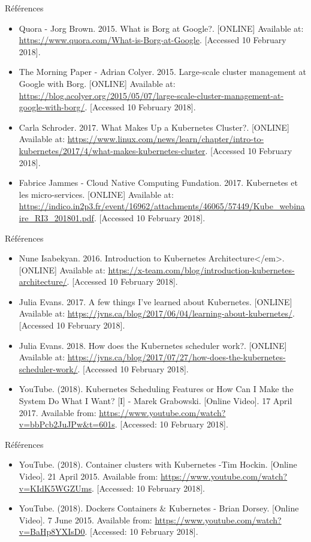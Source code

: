\documentclass{bredelebeamer}
\begin{document}
\begin{frame}{Références}
\begin{itemize}
\item Quora - Jorg Brown. 2015. What is Borg at Google?. [ONLINE] Available at: \url{https://www.quora.com/What-is-Borg-at-Google}. [Accessed 10 February 2018].
\item The Morning Paper - Adrian Colyer. 2015. Large-scale cluster management at Google with Borg. [ONLINE] Available at: \url{https://blog.acolyer.org/2015/05/07/large-scale-cluster-management-at-google-with-borg/}. [Accessed 10 February 2018].
\item Carla Schroder. 2017. What Makes Up a Kubernetes Cluster?. [ONLINE] Available at: \url{https://www.linux.com/news/learn/chapter/intro-to-kubernetes/2017/4/what-makes-kubernetes-cluster}. [Accessed 10 February 2018].
\item Fabrice Jammes - Cloud Native Computing Fundation. 2017. Kubernetes et les micro-services. [ONLINE] Available at: \url{https://indico.in2p3.fr/event/16962/attachments/46065/57449/Kube_webinaire_RI3_201801.pdf}. [Accessed 10 February 2018].
\end{itemize}
\end{frame}


\begin{frame}{Références}
\begin{itemize}
\item Nune Isabekyan. 2016. Introduction to Kubernetes Architecture</em>. [ONLINE] Available at: \url{https://x-team.com/blog/introduction-kubernetes-architecture/}. [Accessed 10 February 2018].
\item Julia Evans. 2017. A few things I've learned about Kubernetes. [ONLINE] Available at: \url{https://jvns.ca/blog/2017/06/04/learning-about-kubernetes/}. [Accessed 10 February 2018].
\item Julia Evans. 2018. How does the Kubernetes scheduler work?. [ONLINE] Available at: \url{https://jvns.ca/blog/2017/07/27/how-does-the-kubernetes-scheduler-work/}. [Accessed 10 February 2018].
\item YouTube. (2018). Kubernetes Scheduling Features or How Can I Make the System Do What I Want? [I] - Marek Grabowski. [Online Video]. 17 April 2017. Available from: \url{https://www.youtube.com/watch?v=bbPcb2JuJPw&t=601s}. [Accessed: 10 February 2018].
\end{itemize}
\end{frame}


\begin{frame}{Références}
\begin{itemize}

\item YouTube. (2018). Container clusters with Kubernetes -Tim Hockin. [Online Video]. 21 April 2015. Available from: \url{https://www.youtube.com/watch?v=KIdK5WGZUms}. [Accessed: 10 February 2018].
\item YouTube. (2018). Dockers Containers \& Kubernetes - Brian Dorsey. [Online Video]. 7 June 2015. Available from: \url{https://www.youtube.com/watch?v=BaHp8YXIsD0}. [Accessed: 10 February 2018].
\end{itemize}
\end{frame}
\end{document}
